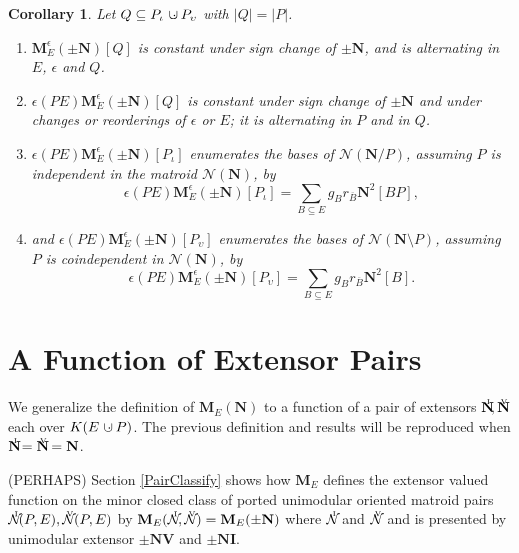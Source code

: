 \documentclass[12pt]{article}
\newtheorem{corollary}[theorem]{Corollary}
\theoremstyle{definition}
\newcommand{\dunion}
{\mbox{\hbox{\hskip6pt$\cdot$\hskip-5.50pt$\cup$\hskip2pt}}}
\newcommand{\scomp}[1]{\ensuremath{\overline{#1}}}
\newcommand{\Is}{\ensuremath{\iota}}
\newcommand{\Vs}{\ensuremath{\upsilon}}
\newcommand{\FieldK}{\ensuremath{K}}
\newcommand{\Card}[1]{\ensuremath{{\left|#1\right|}}}
\newcommand{\ext}[1]{\ensuremath{\mathbf{#1}}}
\newcommand{\NI}{\ensuremath{N^{\raisebox{2pt}{\tiny\hspace{-5.2pt}I}}}}
\newcommand{\NV}{\ensuremath{N^{\raisebox{2pt}{\tiny\hspace{-6.6pt}V}}}}
\begin{document}
\begin{corollary}
\label{BasisCountCorollary}
Let $Q\subseteq P_{\Is}\dunion P_{\Vs}$ with $\Card{Q}=\Card{P}$.
\begin{enumerate}
\item $\ext{M}^\epsilon_E(\pm \ext{N})[Q]$ is constant under sign change of
$\pm \ext{N}$, and is alternating in $E$, $\epsilon$ and $Q$.
\item $\epsilon(PE)\ext{M}^\epsilon_E(\pm \ext{N})[Q]$ 
is constant under sign
change of $\pm \ext{N}$ and under changes or reorderings of 
$\epsilon$ or  $E$; it
is alternating in $P$ and in $Q$.
\item $\epsilon(PE)\ext{M}^\epsilon_E(\pm \ext{N})[P_{\Is}]$
enumerates the bases of
$\mathcal{N}(\ext{N}/P)$, assuming $P$ is independent in the matroid 
$\mathcal{N}(\ext{N})$, by
\[
\epsilon(PE)\ext{M}^\epsilon_E(\pm \ext{N})[P_{\Is}]=
\sum_{B\subseteq E} g_Br_{\scomp{B}}\ext{N}^2[BP],
\]
\item and $\epsilon(PE)\ext{M}^\epsilon_E(\pm \ext{N})[P_{\Vs}]$ 
enumerates the bases of
$\mathcal{N}(\ext{N}\setminus P)$,  
assuming $P$ is coindependent in 
$\mathcal{N}(\ext{N})$, by\[
\epsilon(PE)\ext{M}^\epsilon_E(\pm \ext{N})[P_{\Vs}]=
\sum_{B\subseteq E} g_Br_{\scomp{B}}\ext{N}^2[B].
\]
\end{enumerate}
\end{corollary}


\newpage

\section{A Function of Extensor Pairs}
\label{PairsExtensors}

We generalize the definition of $\ext{M}_E(\ext{N})$ to a function of
a pair of extensors 
$\ext{\NI},\ext{\NV}$ each over $\FieldK (E\dunion P)$.  The previous
definition and results will be reproduced when $\ext{\NI}=\ext{\NV}=\ext{N}$.

(PERHAPS) Section \ref{PairClassify} shows how $\ext{M}_E$ defines the extensor valued 
function on the minor closed class of ported unimodular oriented matroid pairs
$\mathcal{\NI}(P,E),\mathcal{\NV}(P,E)$ by 
$\ext{M}_E(\mathcal{\NI},\mathcal{\NV})=\ext{M}_E(\ext{\pm N})$ where 
$\mathcal{\NI}$ and $\mathcal{\NV}$ and 
is presented by unimodular extensor $\pm \ext{NV}$ and $\pm \ext{NI}$.  
\end{document}
